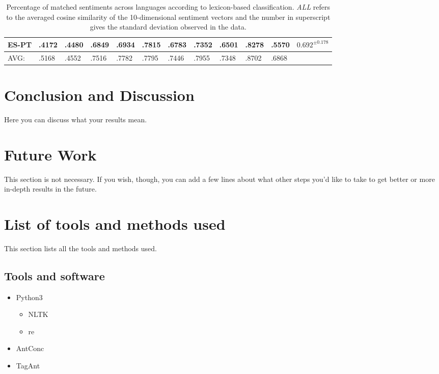 \documentclass[12pt]{article}
\begin{document}
\begin{table}[htbp!]
{\begin{tabular}{|l|lllllllllll|}
ES-PT                                                                                       & .4172 & .4480 & .6849 & .6934    & .7815   & .6783 & .7352 & .6501 & .8278  & .5570 & $0.692^{\pm 0.178}$\\
\hline
\hline
AVG:                                                                                           & .5168 & .4552 & .7516 & .7782    & .7795   & .7446 & .7955 & .7348 & .8702  & .6868 & \\
\hline
\end{tabular}
}
\caption{Percentage of matched sentiments across languages according to lexicon-based classification. {\em ALL} refers to the averaged cosine similarity of the 10-dimensional sentiment vectors and the number in superscript gives the standard deviation observed in the data.}
\label{accuracy}
\end{table}



\section{Conclusion and Discussion}
\label{Conlusion}
Here you can discuss what your results mean.

\section{Future Work}
\label{future}
This section is not necessary. If you wish, though, you can add a few lines about what other steps you'd like to take to get better or more in-depth results in the future.
\section{List of tools and methods used}
This section lists all the tools and methods used.
\subsection{Tools and software}
\begin{itemize}
\item Python3
\begin{itemize}
\item NLTK
\item re
\end{itemize}
\item AntConc
\item TagAnt
\end{itemize}
\end{document}
